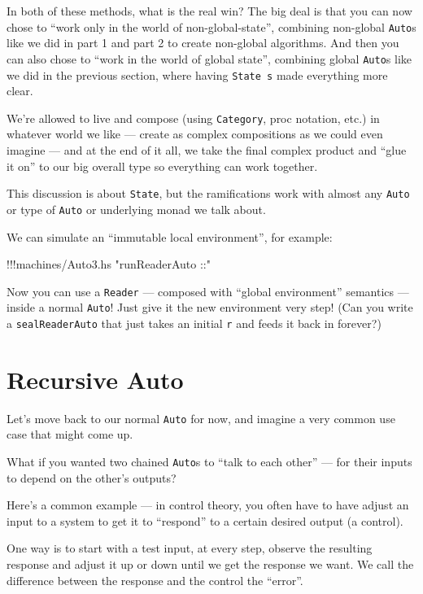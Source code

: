 \documentclass[]{article}
\newenvironment{Shaded}{}{}
\newcommand{\StringTok}[1]{\textcolor[rgb]{0.25,0.44,0.63}{{#1}}}
\newcommand{\FunctionTok}[1]{\textcolor[rgb]{0.02,0.16,0.49}{{#1}}}
\newcommand{\NormalTok}[1]{{#1}}
\begin{document}
In both of these methods, what is the real win? The big deal is that you
can now chose to ``work only in the world of non-global-state'',
combining non-global \texttt{Auto}s like we did in part 1 and part 2 to
create non-global algorithms. And then you can also chose to ``work in
the world of global state'', combining global \texttt{Auto}s like we did
in the previous section, where having \texttt{State\ s} made everything
more clear.

We're allowed to live and compose (using \texttt{Category}, proc
notation, etc.) in whatever world we like --- create as complex
compositions as we could even imagine --- and at the end of it all, we
take the final complex product and ``glue it on'' to our big overall
type so everything can work together.

This discussion is about \texttt{State}, but the ramifications work with
almost any \texttt{Auto} or type of \texttt{Auto} or underlying monad we
talk about.

We can simulate an ``immutable local environment'', for example:

\begin{Shaded}
\begin{Highlighting}[]
\FunctionTok{!!!}\NormalTok{machines}\FunctionTok{/}\NormalTok{Auto3.hs }\StringTok{"runReaderAuto ::"}
\end{Highlighting}
\end{Shaded}

Now you can use a \texttt{Reader} --- composed with ``global
environment'' semantics --- inside a normal \texttt{Auto}! Just give it
the new environment very step! (Can you write a \texttt{sealReaderAuto}
that just takes an initial \texttt{r} and feeds it back in forever?)

\section{Recursive Auto}\label{recursive-auto}

Let's move back to our normal \texttt{Auto} for now, and imagine a very
common use case that might come up.

What if you wanted two chained \texttt{Auto}s to ``talk to each other''
--- for their inputs to depend on the other's outputs?

Here's a common example --- in control theory, you often have to have
adjust an input to a system to get it to ``respond'' to a certain
desired output (a control).

One way is to start with a test input, at every step, observe the
resulting response and adjust it up or down until we get the response we
want. We call the difference between the response and the control the
``error''.
\end{document}
